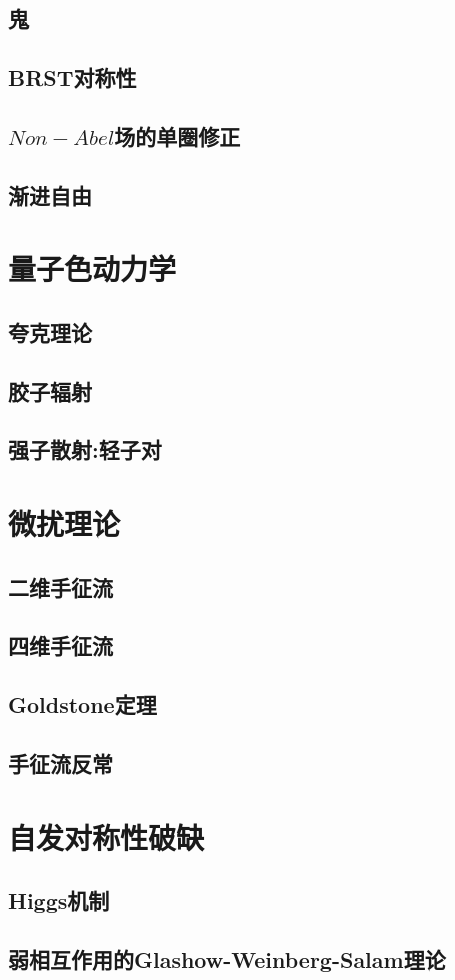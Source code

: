 \documentclass[a4paper,11pt]{article}
\begin{document}
\subsection{鬼}
\subsection{BRST对称性}
\subsection{$Non-Abel$场的单圈修正}
\subsection{渐进自由}
\section{量子色动力学}
\subsection{夸克理论}
\subsection{胶子辐射}
\subsection{强子散射:轻子对}
\section{微扰理论}
\subsection{二维手征流}
\subsection{四维手征流}
\subsection{Goldstone定理}
\subsection{手征流反常}
\section{自发对称性破缺}
\subsection{Higgs机制}
\subsection{弱相互作用的Glashow-Weinberg-Salam理论}
\end{document}
